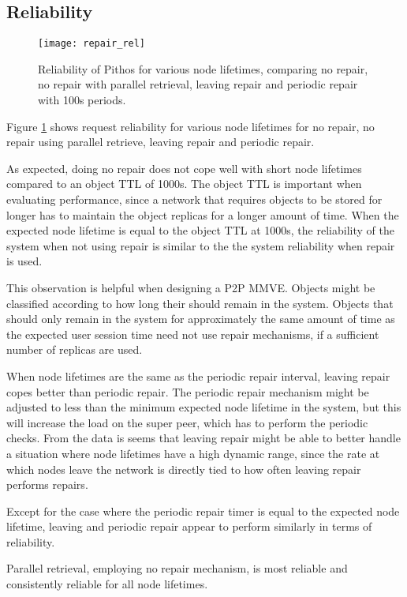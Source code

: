 \subsection{Reliability}

\begin{figure}[htbp]
 \centering
 \texttt{[image: repair\_rel]}
 \caption{Reliability of Pithos for various node lifetimes, comparing no repair, no repair with parallel retrieval, leaving repair and periodic repair with 100s periods.}
 \label{fig_repair_rel}
\end{figure}
%
Figure \ref{fig_repair_rel} shows request reliability for various node lifetimes for no repair, no repair using parallel retrieve, leaving repair and periodic repair.

As expected, doing no repair does not cope well with short node lifetimes compared to an object TTL of 1000s. The object TTL is important when evaluating performance, since a network that requires objects to be stored for longer has to maintain the object replicas for a longer amount of time. When the expected node lifetime is equal to the object TTL at 1000s, the reliability of the system when not using repair is similar to the the system reliability when repair is used.

This observation is helpful when designing a P2P MMVE. Objects might be classified according to how long their should remain in the system. Objects that should only remain in the system for approximately the same amount of time as the expected user session time need not use repair mechanisms, if a sufficient number of replicas are used.

When node lifetimes are the same as the periodic repair interval, leaving repair copes better than periodic repair. The periodic repair mechanism might be adjusted to less than the minimum expected node lifetime in the system, but this will increase the load on the super peer, which has to perform the periodic checks. From the data is seems that leaving repair might be able to better handle a situation where node lifetimes have a high dynamic range, since the rate at which nodes leave the network is directly tied to how often leaving repair performs repairs.

Except for the case where the periodic repair timer is equal to the expected node lifetime, leaving and periodic repair appear to perform similarly in terms of reliability.

Parallel retrieval, employing no repair mechanism, is most reliable and consistently reliable for all node lifetimes.

